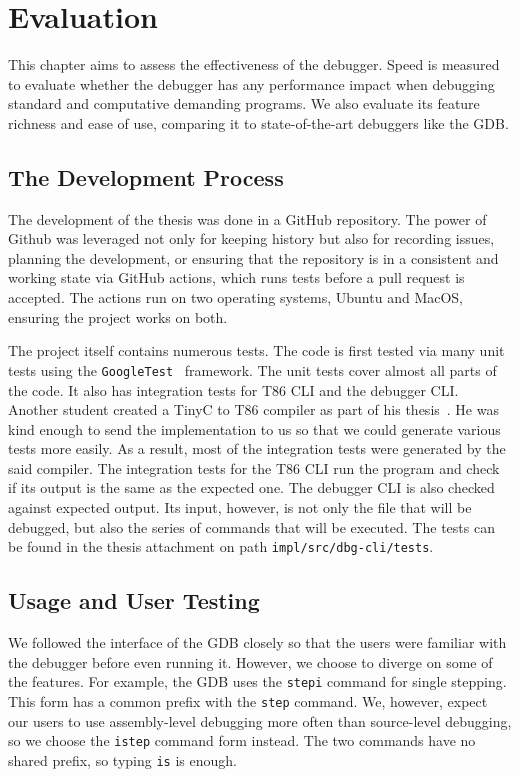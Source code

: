 \chapter{Evaluation}
This chapter aims to assess the effectiveness of the debugger. Speed is
measured to evaluate whether the debugger has any performance impact when
debugging standard and computative demanding programs. We also evaluate its
feature richness and ease of use, comparing it to state-of-the-art debuggers
like the GDB.

\section{The Development Process}
The development of the thesis was done in a GitHub repository. The power of
Github was leveraged not only for keeping history but also for recording
issues, planning the development, or ensuring that the repository is in a
consistent and working state via GitHub actions, which runs tests before a pull
request is accepted. The actions run on two operating systems, Ubuntu and
MacOS, ensuring the project works on both.

The project itself contains numerous tests. The code is first tested via many
unit tests using the \texttt{GoogleTest}~\cite{gtest} framework. The unit
tests cover almost all parts of the code. It also has integration tests for T86
CLI and the debugger CLI. Another student created a TinyC to T86 compiler as
part of his thesis~\cite{martintinyc}. He was kind enough to send the
implementation to us so that we could generate various tests more easily. As a
result, most of the integration tests were generated by the said compiler. The
integration tests for the T86 CLI run the program and check if its output is
the same as the expected one. The debugger CLI is also checked against expected
output. Its input, however, is not only the file that will be debugged, but
also the series of commands that will be executed. The tests can be found
in the thesis attachment on path \texttt{impl/src/dbg-cli/tests}.

\section{Usage and User Testing}
We followed the interface of the GDB closely so that the users were familiar
with the debugger before even running it. However, we choose to diverge on some
of the features. For example, the GDB uses the \texttt{stepi} command for
single stepping. This form has a common prefix with the \texttt{step} command.
We, however, expect our users to use assembly-level debugging more often than
source-level debugging, so we choose the \texttt{istep} command form instead.
The two commands have no shared prefix, so typing \texttt{is} is enough.

